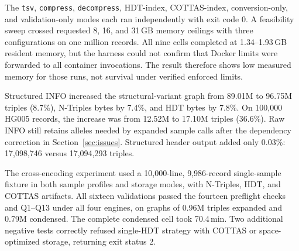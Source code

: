 \documentclass[11pt]{article}
\begin{document}
The \texttt{tsv}, \texttt{compress}, \texttt{decompress}, HDT-index, COTTAS-index, conversion-only, and validation-only modes each ran independently with exit code 0.
A feasibility sweep crossed requested 8, 16, and 31\,GB memory ceilings with three configurations on one million records.
All nine cells completed at 1.34--1.93\,GB resident memory, but the harness could not confirm that Docker limits were forwarded to all container invocations.
The result therefore shows low measured memory for those runs, not survival under verified enforced limits.

Structured INFO increased the structural-variant graph from 89.01M to 96.75M triples (8.7\%), N-Triples bytes by 7.4\%, and HDT bytes by 7.8\%.
On 100,000 HG005 records, the increase was from 12.52M to 17.10M triples (36.6\%).
Raw INFO still retains alleles needed by expanded sample calls after the dependency correction in Section~\ref{sec:issues}.
Structured header output added only 0.03\%: 17,098,746 versus 17,094,293 triples.

The cross-encoding experiment used a 10,000-line, 9,986-record single-sample fixture in both sample profiles and storage modes, with N-Triples, HDT, and COTTAS artifacts.
All sixteen validations passed the fourteen preflight checks and Q1--Q13 under all four engines, on graphs of 0.96M triples expanded and 0.79M condensed.
The complete condensed cell took 70.4\,min.
Two additional negative tests correctly refused single-HDT strategy with COTTAS or space-optimized storage, returning exit status 2.



\end{document}
